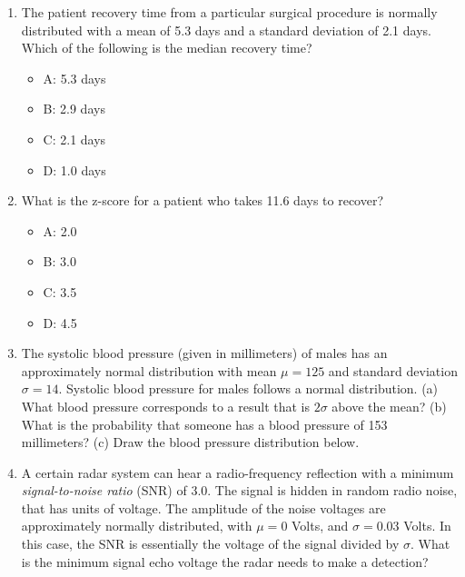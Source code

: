 \documentclass{article}
\begin{document}
\begin{enumerate}
\item The patient recovery time from a particular surgical
procedure is normally distributed with a mean of 5.3 days and a standard deviation of 2.1 days. Which of the following is the median recovery time?
\begin{itemize}
\item A: 5.3 days
\item B: 2.9 days
\item C: 2.1 days
\item D: 1.0 days
\end{itemize}
\item What is the z-score for a patient who takes 11.6 days to recover?
\begin{itemize}
\item A: 2.0
\item B: 3.0
\item C: 3.5
\item D: 4.5
\end{itemize}
\item The systolic blood pressure (given in millimeters) of males has an approximately normal distribution with mean $\mu = 125$ and standard deviation $\sigma = 14$. Systolic blood pressure for males follows a normal distribution. (a) What blood pressure corresponds to a result that is $2\sigma$ above the mean? (b) What is the probability that someone has a blood pressure of 153 millimeters? (c) Draw the blood pressure distribution below. \\ \vspace{2cm}
\item A certain radar system can hear a radio-frequency reflection with a minimum \textit{signal-to-noise ratio} (SNR) of 3.0.  The signal is hidden in random radio noise, that has units of voltage.  The amplitude of the noise voltages are approximately normally distributed, with $\mu = 0$ Volts, and $\sigma = 0.03$ Volts.  In this case, the SNR is essentially the voltage of the signal divided by $\sigma$.  What is the minimum signal echo voltage the radar needs to make a detection?
\end{enumerate}
\end{document}
